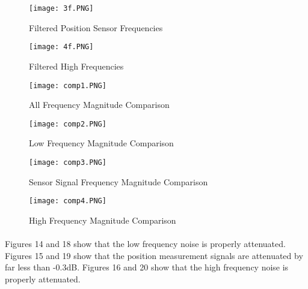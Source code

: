    \begin{figure}[H]
     \centering
   \texttt{[image: 3f.PNG]}
     \caption{Filtered Position Sensor Frequencies}
   \end{figure}
   

	\begin{figure}[H]
		\centering
		\texttt{[image: 4f.PNG]}
		\caption{Filtered High Frequencies}
	\end{figure}
	
	\begin{figure}[H]
		\centering
		\texttt{[image: comp1.PNG]}
		\caption{All Frequency Magnitude Comparison}
	\end{figure}
	
	\begin{figure}[H]
		\centering
		\texttt{[image: comp2.PNG]}
		\caption{Low Frequency Magnitude Comparison}
	\end{figure}

	\begin{figure}[H]
		\centering
		\texttt{[image: comp3.PNG]}
		\caption{Sensor Signal Frequency Magnitude Comparison}
	\end{figure}

	\begin{figure}[H]
		\centering
		\texttt{[image: comp4.PNG]}
		\caption{High Frequency Magnitude Comparison}
	\end{figure}

\paragraph{}
Figures 14 and 18 show that the low frequency noise is properly attenuated.  Figures 15 and 19 show that the position measurement signals are attenuated by far less than -0.3dB.  Figures 16 and 20 show that the high frequency noise is properly attenuated.


